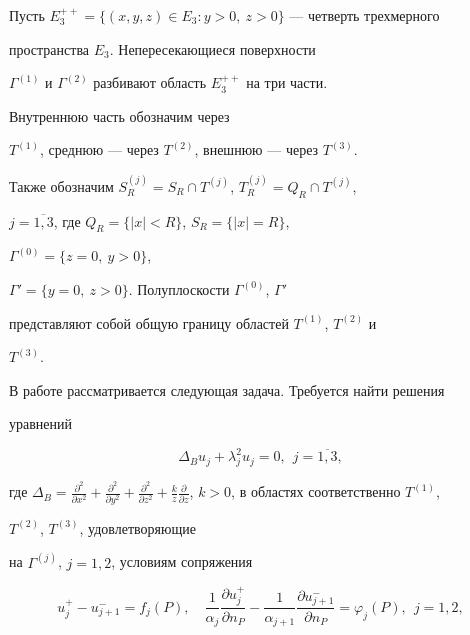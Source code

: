 \label{begin}








Пусть $E_3^{++}=\{(x,y,z)\in E_3: y>0,\ z>0\}$ --- четверть трехмерного 


пространства $E_3$. Непересекающиеся поверхности 


$\Gamma^{(1)}$ и $\Gamma^{(2)}$ разбивают область $E_3^{++}$ на три части. 


Внутреннюю часть обозначим через 


$T^{(1)}$, среднюю --- через  $T^{(2)}$, внешнюю --- через $T^{(3)}$.


Также обозначим $S_R^{(j)}=S_R\cap T^{(j)}$, $T_R^{(j)}=Q_R\cap T^{(j)}$,


$j=\overline{1, 3}$, где $Q_R=\{|x|<R\}$, $S_R=\{|x|=R\}$,


$\Gamma^{(0)}=\{z=0,\ y>0\}$,


$\Gamma'=\{y=0,\ z>0\}$. Полуплоскости $\Gamma^{(0)}$, $\Gamma'$


представляют собой общую границу областей $T^{(1)}$, $T^{(2)}$ и 


$T^{(3)}$.





В работе рассматривается следующая задача. Требуется найти решения 


уравнений 


\begin{equation}


\Delta_B u_j+\lambda_j^2 u_j=0,\ \ j=\overline{1, 3},


\end{equation}


где $\Delta_B=\frac{\partial ^2 }{\partial x^2}+\frac{\partial ^2 }


{\partial y^2}+\frac{\partial ^2} {\partial z^2}+\frac{k}{z}


\frac{\partial }{\partial z}$, $k>0$, в областях соответственно $T^{(1)}$, 


$T^{(2)}$, $T^{(3)}$, удовлетворяющие 


на $\Gamma^{(j)}$, $j=1,2$, условиям сопряжения


\begin{equation}


u_j^+-u_{j+1}^-=f_j(P),\quad


\frac{1}{\alpha_j}\frac{\partial u_j^+}{\partial n_P}-


\frac{1}{\alpha_{j+1}}\frac{\partial u_{j+1}^-}{\partial n_P}=\varphi_j(P),


\ \ j=1,2,


\end{equation}



